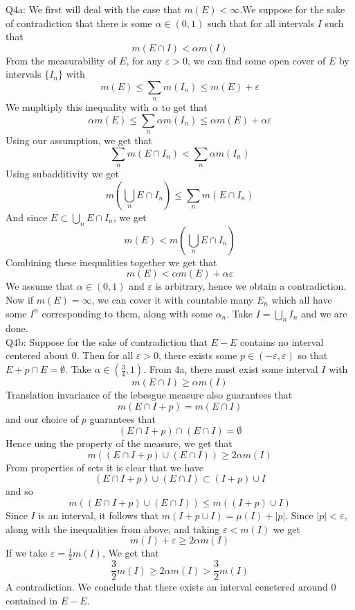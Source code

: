 \documentclass[letterpaper]{article}
\begin{document}
\noindent Q4a: We first will deal with the case that $m(E)< \infty$.We suppose for the sake of contradiction that there is some $\alpha\in (0,1)$ such that for all intervals $I$ such that $$m(E \cap I)< \alpha m(I)$$
From the measurability of $E$, for any $\varepsilon>0$, we can find some open cover of $E$ by intervals $\{I_n\}$ with $$m(E) \leq \sum_{n}m(I_n) \leq m(E) + \varepsilon$$ 
We mupltiply this inequality with $\alpha$ to get that $$\alpha m(E ) \leq \sum_n \alpha m(I_n) \leq \alpha m(E) + \alpha \varepsilon $$ 
Using our assumption, we get that $$\sum_n m(E \cap I_n) < \sum_{n} \alpha m(I_n)$$
Using subadditivity we get $$m(\bigcup_{n} E \cap I_n) \leq \sum_n m(E \cap I_n) $$ And since $E \subset \bigcup_{n} E \cap I_n$, we get $$m(E) < m(\bigcup_{n} E \cap I_n)$$
Combining these inequalities together we get that $$m(E) < \alpha m(E) + \alpha \varepsilon$$ 
We assume that $\alpha\in (0,1)$ and $\varepsilon$ is arbitrary, hence we obtain a contradiction. Now if $m(E) = \infty$, we can cover it with countable many $E_n$ which all have some $I^n$ corresponding to them, along with some $\alpha_n$. Take $I = \bigcup_n I_n$ and we are done. 
\newline \\ \noindent
Q4b: Suppose for the sake of contradiction that $E- E$ contains no interval centered about $0$. Then for all $\varepsilon>0$, there exists some $p\in (-\varepsilon, \varepsilon)$ so that $E+p \cap E = \emptyset$. Take $\alpha \in (\frac{3}{4}, 1)$. From 4a, there must exist some interval $I$ with $$m(E \cap I)\geq \alpha m(I)$$
Translation invariance of the lebesgue measure also guarantees that $$m(E\cap I + p) = m(E \cap I)$$
and our choice of $p$ guarantees that $$(E \cap I +p)\cap(E\cap I) = \emptyset$$
Hence using the property of the measure, we get that $$ m((E \cap I +p)\cup(E\cap I)) \geq 2\alpha m(I) $$
From properties of sets it is clear that we have $$(E\cap I+p) \cup (E\cap I) \subset (I+p)\cup I$$ and so $$m((E\cap I+p) \cup (E\cap I)) \leq m((I+p)\cup I )$$
Since $I$ is an interval, it follows that $m( I + p \cup I) = \mu(I) + |p|$. Since $|p|<\varepsilon$, along with the inequalities from above, and taking $\varepsilon<m(I)$ we get $$m(I) + \varepsilon \geq 2\alpha m(I)$$
If we take $\varepsilon = \frac{1}{2}m(I)$, 
We get that $$\frac{3}{2} m(I) \geq 2\alpha m(I) > \frac{3}{2} m(I)$$
A contradiction. We conclude that there exists an interval cenetered around $0$ contained in $E-E$. 
\end{document}
